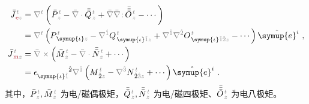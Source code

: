 \begin{subequations} \label{eq:J-em}
	\abovedisplayskip=8pt
	\belowdisplayskip=10pt
\begin{align}
	\bar{J}^{\;\!\mathcolor{gray}{t}}_{\;\!\textcolor{Maroon}{\text{e}}\mathcolor{gray}{z}} &= \mathcolor{gray}{\nabla^t} \left( \bar{P}^{\;\!\mathcolor{gray}{t}}_{\;\!\mathcolor{gray}{z}} - \mathcolor{gray}{\bar{\nabla} \cdot} \bar{\bar{Q}}^{\;\!\mathcolor{gray}{t}}_{\;\!\mathcolor{gray}{z}} + \mathcolor{gray}{\bar{\nabla}} \mathcolor{gray}{\bar{\nabla} \colon}\! \bar{\bar{\bar{O}}}^{\;\!\mathcolor{gray}{t}}_{\;\!\mathcolor{gray}{z}} - \cdots \right) \label{eq:J-e} \\ 
	&= \mathcolor{gray}{\nabla^t} \left( P^{\;\!\mathcolor{gray}{t}}_{\;\! \symup{\iota}\mathcolor{gray}{z}} - \mathcolor{gray}{\nabla^{\hat{1}}} Q^{\;\!\mathcolor{gray}{t}}_{\;\! \symup{\iota} \mathcolor{gray}{\hat{1}} \mathcolor{gray}{z}} + \mathcolor{gray}{\nabla^{\hat{1}}} \mathcolor{gray}{\nabla^{\hat{2}}} O^{\;\!\mathcolor{gray}{t}}_{\;\! \symup{\iota} \mathcolor{gray}{\hat{1}\hat{2}} \mathcolor{gray}{z}} - \cdots \right) \hat{\symup{e}}^i~, \label{eq:j-e} \\ 
	\bar{J}^{\;\!\mathcolor{gray}{t}}_{\;\!\textcolor{Maroon}{\text{m}}\mathcolor{gray}{z}} &= \mathcolor{gray}{\bar{\nabla} \times} \left( \bar{M}^{\;\!\mathcolor{gray}{t}}_{\;\!\mathcolor{gray}{z}} - \mathcolor{gray}{\bar{\nabla} \cdot} \bar{\bar{N}}^{\;\!\mathcolor{gray}{t}}_{\;\!\mathcolor{gray}{z}} + \cdots \right) \label{eq:J-m} \\ 
	&= \epsilon^{\hphantom{\symup{\iota}\hat{1}}\hat{2}}_{\symup{\iota}\mathcolor{gray}{\hat{1}}} \mathcolor{gray}{\nabla^{\hat{1}}} \left( M^{\;\!\mathcolor{gray}{t}}_{\;\! \hat{2}\mathcolor{gray}{z}} - \mathcolor{gray}{\nabla^{\hat{3}}} N^{\;\!\mathcolor{gray}{t}}_{\;\! \hat{2} \mathcolor{gray}{\hat{3}} \mathcolor{gray}{z}} + \cdots \right) \hat{\symup{e}}^i~. \label{eq:j-m}
\end{align}
\end{subequations}
其中，$\bar{P}^{\;\!\mathcolor{gray}{t}}_{\;\!\mathcolor{gray}{z}}, \bar{M}^{\;\!\mathcolor{gray}{t}}_{\;\!\mathcolor{gray}{z}}$ 为电/磁偶极矩，$\bar{\bar{Q}}^{\;\!\mathcolor{gray}{t}}_{\;\!\mathcolor{gray}{z}}, \bar{\bar{N}}^{\;\!\mathcolor{gray}{t}}_{\;\!\mathcolor{gray}{z}}$ 为电/磁四极矩、$\bar{\bar{\bar{O}}}^{\;\!\mathcolor{gray}{t}}_{\;\!\mathcolor{gray}{z}}$ 为电八极矩。

